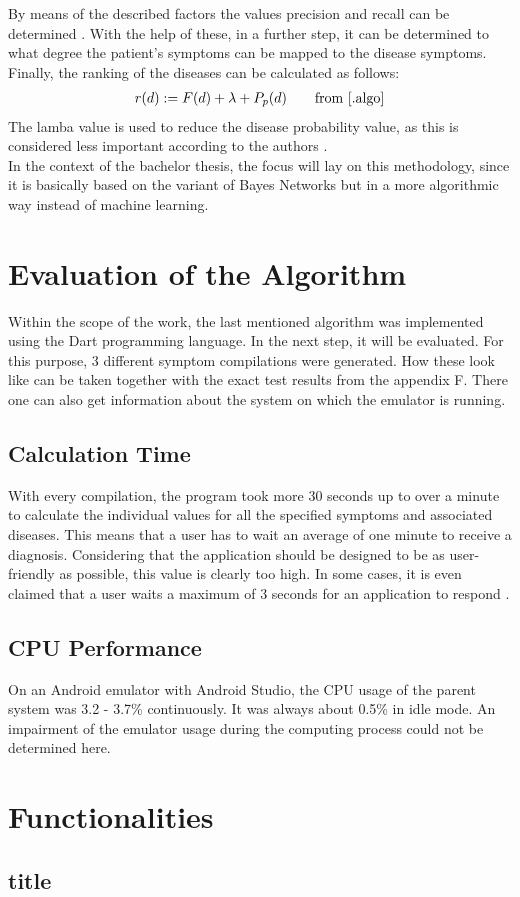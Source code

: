 \noindent
By means of the described factors the values precision and recall can be determined \cite[p. 9]{.algo}. With the help of these, in a further step, it can be determined to what degree the patient's symptoms can be mapped to the disease symptoms. Finally, the ranking of the diseases can be calculated as follows:
\begin{equation}
	  \begin{aligned}
		r(d) := F(d) + \lambda + P_p(d)\\
	 \end{aligned}\qquad\text{from \cite{.algo}}
\end{equation}
The lamba value is used to reduce the disease probability value, as this is considered less important according to the authors \cite[p. 10]{.algo}. 
\newline \\
In the context of the bachelor thesis, the focus will lay on this methodology, since it is basically based on the variant of Bayes Networks but in a more algorithmic way instead of machine learning.


\section{Evaluation of the Algorithm}
Within the scope of the work, the last mentioned algorithm was implemented using the Dart programming language. In the next step, it will be evaluated. For this purpose, 3 different symptom compilations were generated. How these look like can be taken together with the exact test results from the appendix F.  There one can also get information about the system on which the emulator is running.

\subsection{Calculation Time}
With every compilation, the program took more 30 seconds up to over a minute to calculate the individual values for all the specified symptoms and associated diseases. This means that a user has to wait an average of one minute to receive a diagnosis. Considering that the application should be designed to be as user-friendly as possible, this value is clearly too high. In some cases, it is even claimed that a user waits a maximum of 3 seconds for an application to respond \cite{.3sek}.

\subsection{CPU Performance}
On an Android emulator with Android Studio, the CPU usage of the parent system was 3.2 - 3.7\% continuously. It was always about 0.5\% in idle mode. An impairment of the emulator usage during the computing process could not be determined here.
  
\section{Functionalities}
\subsection{title}